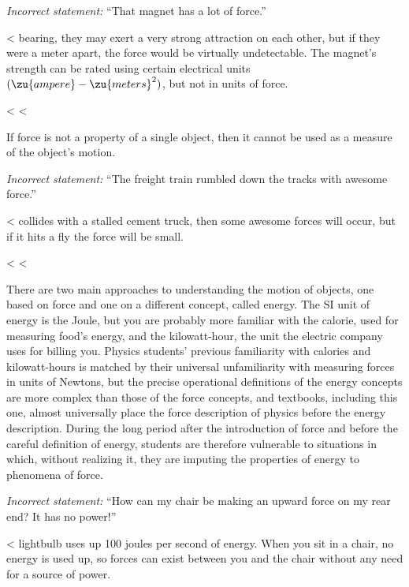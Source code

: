 \begin{egnoheader}
\emph{Incorrect statement:\/} ``That magnet has a lot of force.''

\noindent<%
bearing, they may exert a very strong attraction on each
other, but if they were a meter apart, the force would be
virtually undetectable. The magnet's strength can be rated
using certain electrical units $(\zu{ampere}-\zu{meters}^2)$, but
not in units of force.
\end{egnoheader}

<%
<%

If force is not a property of a single object, then it
cannot be used as a measure of the object's motion.

\begin{egnoheader}
\emph{Incorrect statement:\/} ``The freight train rumbled down the
tracks with awesome force.''

\noindent<%
collides with a stalled cement truck, then some awesome
forces will occur, but if it hits a fly the force will be small.
\end{egnoheader}

<%
<%

There are two main approaches to understanding the motion of
objects, one based on force and one on a different concept,
called energy. The SI unit of energy is the Joule, but you
are probably more familiar with the calorie, used for
measuring food's energy, and the kilowatt-hour, the unit the
electric company uses for billing you. Physics students'
previous familiarity with calories and kilowatt-hours is
matched by their universal unfamiliarity with measuring
forces in units of Newtons, but the precise operational
definitions of the energy concepts are more complex than
those of the force concepts, and textbooks, including this
one, almost universally place the force description of
physics before the energy description. During the long
period after the introduction of force and before the
careful definition of energy, students are therefore
vulnerable to situations in which, without realizing it,
they are imputing the properties of energy to phenomena of force.

\begin{egnoheader}
\emph{Incorrect statement:\/} ``How can my chair be making an upward
force on my rear end? It has no power!''

\noindent<%
lightbulb uses up 100 joules per second of energy. When you
sit in a chair, no energy is used up, so forces can exist
between you and the chair without any need for a source of power.
\end{egnoheader}

